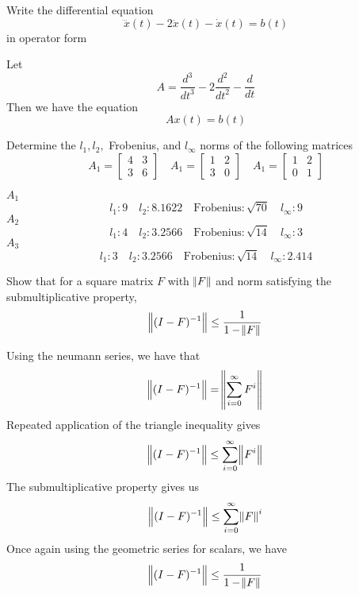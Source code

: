 \documentclass{homework}
\begin{document}
\begin{problem}[4-1]
  Write the differential equation
  \[\dddot{x}(t) - 2\ddot{x}(t) - \dot{x}(t) = b(t)\]
  in operator form
\end{problem}

\begin{solution}
  Let 
  \[ A = \frac{d^3}{dt^3} - 2 \frac{d^2}{dt^2} - \frac{d}{dt} \]
  Then we have the equation
  \[ Ax(t) = b(t)\]
\end{solution}

\begin{problem}[4-4]
  Determine the $l_1,l_2,$ Frobenius, and $l_{\infty}$ norms of the following matrices
  \[ A_1 =
    \begin{bmatrix}
      4 & 3 \\
      3 & 6
    \end{bmatrix}
    \quad 
    A_1 =
    \begin{bmatrix}
      1 & 2 \\
      3 & 0
    \end{bmatrix}
    \quad
    A_1 =
    \begin{bmatrix}
      1 & 2 \\
      0 & 1
    \end{bmatrix}
  \]
\end{problem}

\begin{solution}
  $A_1$
  \[ l_1: 9 \quad l_2: 8.1622 \quad \text{Frobenius}: \sqrt{70} \quad l_\infty: 9\]
  $A_2$
  \[ l_1: 4 \quad l_2: 3.2566 \quad \text{Frobenius}: \sqrt{14} \quad l_\infty: 3\]
  $A_3$
  \[ l_1: 3 \quad l_2: 3.2566 \quad \text{Frobenius}: \sqrt{14} \quad l_\infty: 2.414\]
\end{solution}

\begin{problem}[4-10]
  Show that for a square matrix $F$ with $\norm{F}$ and norm satisfying the submultiplicative property,
 \[ \norm{(I - F)^{-1}} \leq \frac{1}{1 - \norm{F}} \]
\end{problem}

\begin{solution}
  Using the neumann series, we have that 
  \[ \norm{(I-F)^{-1}} = \norm{ \sum^{\infty}_{i=0} F^i} \]
  Repeated application of the triangle inequality gives
  \[ \norm{(I-F)^{-1}} \leq \sum^{\infty}_{i=0} \norm{F^i} \]
  The submultiplicative property gives us
  \[ \norm{(I-F)^{-1}} \leq \sum^{\infty}_{i=0} \norm{F}^i \]
  Once again using the geometric series for scalars, we have
  \[ \norm{(I-F)^{-1}} \leq \frac{1}{1 - \norm{F}} \]
\end{solution}
\end{document}
